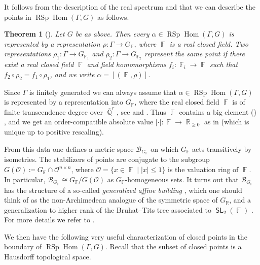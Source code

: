 \documentclass{amsart}
\theoremstyle{plain}
\newtheorem{theorem}[proposition]{Theorem}
\theoremstyle{definition}
\DeclareMathOperator{\SL}{\mathsf{SL}}
\DeclareMathOperator{\Hom}{Hom}
\DeclareMathOperator{\rsp}{RSp}
\DeclareMathOperator{\Fb}{{\mathbb{F}}}
\DeclareMathOperator{\Rb}{{\mathbb{R}}}
\DeclareMathOperator{\Qb}{\mathbb{Q}}
\newcommand{\abs}[1]{\left|#1\right|}
\newcommand*\from{\colon}
\newcommand{\Qbar}{\overline{\Qb}^r}
\newcommand{\1}{\mathbf{1}}
\begin{document}
It follows from the description of the real spectrum and  that we can describe the points in $\rsp\Hom(\Gamma, G)$ as follows.

\begin{theorem}[{\cite[Proposition 6.3]{BurgerIozziParreauPozzetti_RSCCharacterVarieties2}}]
\label{thm_RSCCharBoundary}
Let $G$ be as above.
Then every $\alpha \in \rsp\Hom(\Gamma, G)$ is represented by a representation $\rho \from \Gamma \to  G_{\Fb}$, where $\Fb$ is a real closed field.
Two representations $\rho_1 \from \Gamma \to G_{\Fb_1}$ and $\rho_2 \from \Gamma \to G_{\Fb_2}$ represent the same point if there exist a real closed field $\Fb$ and field homomorphisms $f_i \from \Fb_{i} \to \Fb$ such that $f_2 \circ \rho_2=f_1 \circ \rho_1$, and we write $\alpha=[(\Fb,\rho)]$.
\end{theorem}

Since $\Gamma$ is finitely generated we can always assume that $\alpha \in \rsp\Hom(\Gamma,G)$ is represented by a representation into $G_{\Fb}$, where the real closed field $\Fb$ is of finite transcendence degree over $\Qbar$, see \cite[\S 6]{Brumfiel_RSCTeichmullerSpace} and \cite[Proposition 6.3]{BurgerIozziParreauPozzetti_RSCCharacterVarieties2}.
Thus $\Fb$ contains a big element () \cite[\S 5]{Brumfiel_RSCTeichmullerSpace}, and we get an order-compatible absolute value $\abs{\cdot} \colon \Fb \to \Rb_{\geq 0}$ as in  (which is unique up to positive rescaling).

From this data one defines a metric space $\mathcal{B}_{G_{\Fb}}$ on which $G_{\Fb}$ acts transitively by isometries.
The stabilizers of points are conjugate to the subgroup $G(\mathcal{O})\coloneqq G_{\Fb} \cap \mathcal{O}^{n \times n}$, where $\mathcal{O}=\{ x \in \Fb \mid \abs{x}\leq 1\}$ is the valuation ring of $\Fb$.
In particular, $\mathcal{B}_{G_{\Fb}} \cong G_{\Fb}/G(\mathcal{O})$ as $G_{\Fb}$-homogeneous sets.
It turns out that $\mathcal{B}_{G_{\Fb}}$ has the structure of a so-called \emph{generalized affine building} \cite{Appenzeller}, which one should think of as the non-Archimedean analogue of the symmetric space of $G_{\Rb}$, and a generalization to higher rank of the Bruhat--Tits tree associated to $\SL_2(\Fb)$ \cite{Brumfiel_TreeNonArchimedeanHyperbolicPlane}.
For more details we refer to \cite{BurgerIozziParreauPozzetti_RSCCharacterVarieties2, Appenzeller}.

We then have the following very useful characterization of closed points in the boundary of $\rsp\Hom(\Gamma,G)$.
Recall that the subset of closed points is a Hausdorff topological space.
\end{document}
